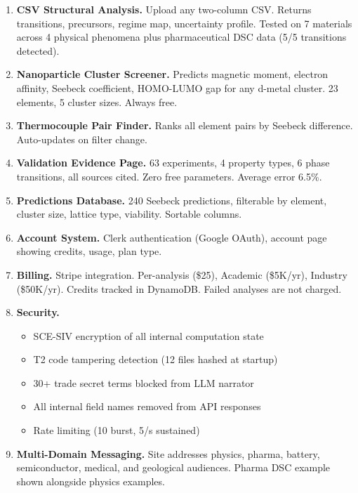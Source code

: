 \documentclass[11pt,letterpaper]{article}
\begin{document}
\begin{enumerate}
  \item \textbf{CSV Structural Analysis.} Upload any two-column CSV.
    Returns transitions, precursors, regime map, uncertainty profile.
    Tested on 7 materials across 4 physical phenomena plus
    pharmaceutical DSC data (5/5 transitions detected).

  \item \textbf{Nanoparticle Cluster Screener.} Predicts magnetic moment,
    electron affinity, Seebeck coefficient, HOMO-LUMO gap for any
    d-metal cluster. 23 elements, 5 cluster sizes. Always free.

  \item \textbf{Thermocouple Pair Finder.} Ranks all element pairs by
    Seebeck difference. Auto-updates on filter change.

  \item \textbf{Validation Evidence Page.} 63 experiments, 4 property
    types, 6 phase transitions, all sources cited. Zero free parameters.
    Average error 6.5\%.

  \item \textbf{Predictions Database.} 240 Seebeck predictions,
    filterable by element, cluster size, lattice type, viability.
    Sortable columns.

  \item \textbf{Account System.} Clerk authentication (Google OAuth),
    account page showing credits, usage, plan type.

  \item \textbf{Billing.} Stripe integration. Per-analysis (\$25),
    Academic (\$5K/yr), Industry (\$50K/yr). Credits tracked in
    DynamoDB. Failed analyses are not charged.

  \item \textbf{Security.}
    \begin{itemize}
      \item SCE-SIV encryption of all internal computation state
      \item T2 code tampering detection (12 files hashed at startup)
      \item 30+ trade secret terms blocked from LLM narrator
      \item All internal field names removed from API responses
      \item Rate limiting (10 burst, 5/s sustained)
    \end{itemize}

  \item \textbf{Multi-Domain Messaging.} Site addresses physics,
    pharma, battery, semiconductor, medical, and geological
    audiences. Pharma DSC example shown alongside physics examples.
\end{enumerate}
\end{document}
